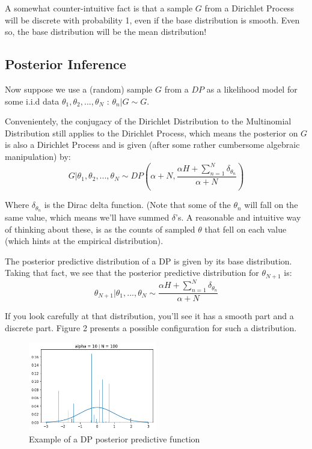 \documentclass[11pt]{article}
\begin{document}
A somewhat counter-intuitive fact is that a sample \(G\) from a
Dirichlet Process will be discrete with probability 1, even if the base
distribution is smooth. Even so, the base distribution will be the mean
distribution!
	
\subsection{Posterior Inference}\label{posterior-inference}
	
Now suppose we use a (random) sample \(G\) from a \(DP\) as a likelihood
model for some i.i.d data \(\theta_1, \theta_2, ..., \theta_N\) :
\(\theta_n | G \sim G\).
	
Convenientely, the conjugacy of the Dirichlet Distribution to the
Multinomial Distribution still applies to the Dirichlet Process, which
means the posterior on \(G\) is also a Dirichlet Process and is given
(after some rather cumbersome algebraic manipulation) by:
\[ G | \theta_1, \theta_2, ..., \theta_N \sim DP(\alpha+N , \frac{\alpha H + \sum_{n=1}^{N}\delta_{\theta_n}}{\alpha+N}) \]
	
Where \(\delta_{\theta_n}\) is the Dirac delta function. (Note that some
of the \(\theta_n\) will fall on the same value, which means we'll have
summed \(\delta\)'s. A reasonable and intuitive way of thinking about
these, is as the counts of sampled \(\theta\) that fell on each value
(which hints at the empirical distribution).
	
The posterior predictive distribution of a DP is given by its base
distribution. Taking that fact, we see that the posterior predictive
distribution for \(\theta_{N+1}\) is:
\[\theta_{N+1} | \theta_1, ..., \theta_N \sim \frac{\alpha H + \sum_{n=1}^{N}\delta_{\theta_n}}{\alpha+N}\]
	
If you look carefully at that distribution, you'll see it has a smooth
part and a discrete part. Figure 2 presents a possible configuration for such a distribution.
	
\begin{figure}
	\centering
	\caption{Example of a DP posterior predictive function}
	\includegraphics[width=0.5\textwidth]{output_19_0.png}
\end{figure}
	
\end{document}
